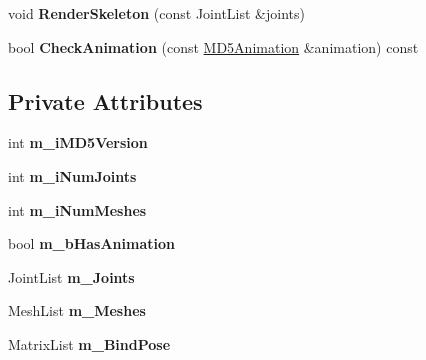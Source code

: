 \begin{DoxyCompactItemize}
\item 
void {\bfseries Render\+Skeleton} (const Joint\+List \&joints)\hypertarget{class_m_d5_model_a9d98112488d5ee40861854265f3ca3af}{}\label{class_m_d5_model_a9d98112488d5ee40861854265f3ca3af}

\item 
bool {\bfseries Check\+Animation} (const \hyperlink{class_m_d5_animation}{M\+D5\+Animation} \&animation) const \hypertarget{class_m_d5_model_ac12c62307502306fa8a8777bd8f2aa09}{}\label{class_m_d5_model_ac12c62307502306fa8a8777bd8f2aa09}

\end{DoxyCompactItemize}
\subsection*{Private Attributes}
\begin{DoxyCompactItemize}
\item 
int {\bfseries m\+\_\+i\+M\+D5\+Version}\hypertarget{class_m_d5_model_aac45d29f6dfa32ae952dda99b3a4ef93}{}\label{class_m_d5_model_aac45d29f6dfa32ae952dda99b3a4ef93}

\item 
int {\bfseries m\+\_\+i\+Num\+Joints}\hypertarget{class_m_d5_model_a82b951d7d256adefa14dd451ff0be77f}{}\label{class_m_d5_model_a82b951d7d256adefa14dd451ff0be77f}

\item 
int {\bfseries m\+\_\+i\+Num\+Meshes}\hypertarget{class_m_d5_model_af7f5f9dadf2e6d5528fd7ba0cecb60aa}{}\label{class_m_d5_model_af7f5f9dadf2e6d5528fd7ba0cecb60aa}

\item 
bool {\bfseries m\+\_\+b\+Has\+Animation}\hypertarget{class_m_d5_model_aa5469e09321b4d646ce358a11fa198c4}{}\label{class_m_d5_model_aa5469e09321b4d646ce358a11fa198c4}

\item 
Joint\+List {\bfseries m\+\_\+\+Joints}\hypertarget{class_m_d5_model_ac214f7fe97a3dbdca045ac01586c8fb2}{}\label{class_m_d5_model_ac214f7fe97a3dbdca045ac01586c8fb2}

\item 
Mesh\+List {\bfseries m\+\_\+\+Meshes}\hypertarget{class_m_d5_model_ad851c031119862ff623ef6db57a537d7}{}\label{class_m_d5_model_ad851c031119862ff623ef6db57a537d7}

\item 
Matrix\+List {\bfseries m\+\_\+\+Bind\+Pose}\hypertarget{class_m_d5_model_afe2e2f60a8329e944e09d6eb42c97d51}{}\label{class_m_d5_model_afe2e2f60a8329e944e09d6eb42c97d51}


\end{DoxyCompactItemize}
